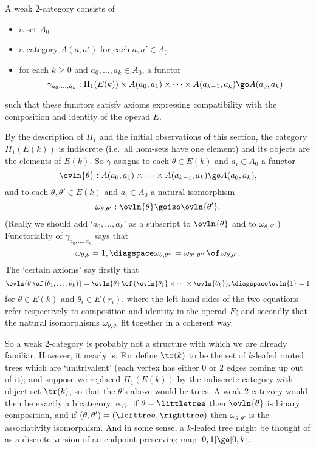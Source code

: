 
A weak 2-category  consists of
%
\begin{itemize}
\item a set $A_0$
\item a category $A(a,a')$ for each $a, a' \in A_0$
\item for each $k\geq 0$ and $a_0, \ldots, a_k \in A_0$, a functor
\[
\gamma_{a_0, \ldots, a_k}:
\Pi_1(E(k)) \times A(a_0,a_1) \times\cdots\times A(a_{k-1},a_k)
\go
A(a_0,a_k)
\]
\end{itemize}
%
such that these functors satisfy axioms expressing compatibility with the
composition and identity of the operad $E$. 

By the description of $\Pi_1$ and the initial observations of this section,
the category $\Pi_1(E(k))$ is indiscrete (i.e.\ all hom-sets have one
element) and its objects are the elements of $E(k)$.  So $\gamma$ assigns to
each $\theta \in E(k)$ and $a_i\in A_0$ a functor
\[
\ovln{\theta}: 
A(a_0,a_1) \times\cdots\times A(a_{k-1},a_k)
\go
A(a_0,a_k),
\] 
and to each $\theta, \theta' \in E(k)$ and $a_i\in A_0$ a natural isomorphism
\[
\omega_{\theta,\theta'}: \ovln{\theta} \goiso \ovln{\theta'}.
\]
(Really we should add `$a_0, \ldots, a_k$' as a subscript to $\ovln{\theta}$
and to $\omega_{\theta,\theta'}$.)  Functoriality of $\gamma_{a_0, \ldots,
a_k}$ says that
\[
\omega_{\theta,\theta} = 1, \diagspace 
\omega_{\theta, \theta''} = 
\omega_{\theta',\theta''} \,\of\, \omega_{\theta,\theta'}.
\]
The `certain axioms' say firstly that 
\[
\ovln{\theta \,\of\, (\theta_1, \ldots, \theta_k)} =
\ovln{\theta} \,\of\, (\ovln{\theta_1} \times \cdots \times \ovln{\theta_k}),
\diagspace
\ovln{1} = 1
\]
for $\theta\in E(k)$ and $\theta_i\in E(r_i)$, where the left-hand sides of
the two equations refer respectively to composition and identity in the
operad $E$; and secondly that the natural isomorphisms
$\omega_{\theta,\theta'}$ fit together in a coherent way.

So a weak 2-category is probably not a structure with which we are already
familiar.  However, it nearly is.  For define $\tr(k)$ to be the set of
$k$-leafed rooted trees which are `unitrivalent' (each vertex has either 0 or
2 edges coming up out of it); and suppose we replaced $\Pi_1(E(k))$ by the
indiscrete category with object-set $\tr(k)$, so that the $\theta$'s above
would be trees.  A weak 2-category would then be exactly a bicategory: e.g.\
if $\theta=\littletree$ then $\ovln{\theta}$ is binary composition, and if
$(\theta,\theta') = (\lefttree,\righttree)$ then $\omega_{\theta,\theta'}$
is the associativity isomorphism.  And in some sense, a $k$-leafed tree might
be thought of as a discrete version of an endpoint-preserving map $[0,1] \go
[0,k]$.

